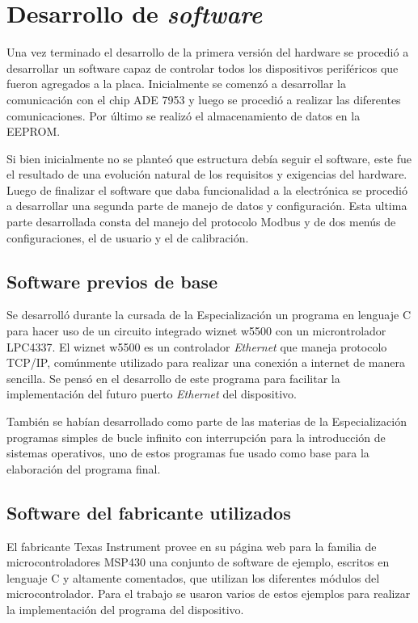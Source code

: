 

\section{Desarrollo de \textit{software}}

Una vez terminado el desarrollo de la primera versión del hardware se procedió a desarrollar un software capaz de controlar todos los dispositivos periféricos que fueron agregados a la placa. Inicialmente se comenzó a desarrollar la comunicación con el chip ADE 7953 y luego se procedió a realizar las diferentes comunicaciones. Por último se realizó el almacenamiento de datos en la EEPROM.

Si bien inicialmente no se planteó que estructura debía seguir el software, este fue el resultado de una evolución natural de los requisitos y exigencias del hardware. Luego de finalizar el software que daba funcionalidad a la electrónica se procedió a desarrollar una segunda parte de manejo de datos y configuración. Esta ultima parte desarrollada consta del manejo del protocolo Modbus y de dos menús de configuraciones, el de usuario y el de calibración.


\subsection{Software previos de base}
Se desarrolló durante la cursada de la Especialización un programa en lenguaje C para hacer uso de un circuito integrado wiznet w5500 con un microntrolador LPC4337. El wiznet w5500 es un controlador \textit{Ethernet} que maneja protocolo TCP/IP, comúnmente utilizado para realizar una conexión a internet de manera sencilla. Se pensó en el desarrollo de este programa para facilitar la implementación del futuro puerto \textit{Ethernet} del dispositivo.

También se habían desarrollado como parte de las materias de la Especialización programas simples de bucle infinito con interrupción para la introducción de sistemas operativos, uno de estos programas fue usado como base para la elaboración del programa final.


\subsection{Software del fabricante utilizados}

El fabricante Texas Instrument provee en su página web para la familia de microcontroladores MSP430 una conjunto de software de ejemplo, escritos en lenguaje C y altamente comentados, que utilizan los diferentes módulos del microcontrolador. Para el trabajo se usaron varios de estos ejemplos para realizar la implementación del programa del dispositivo.  


